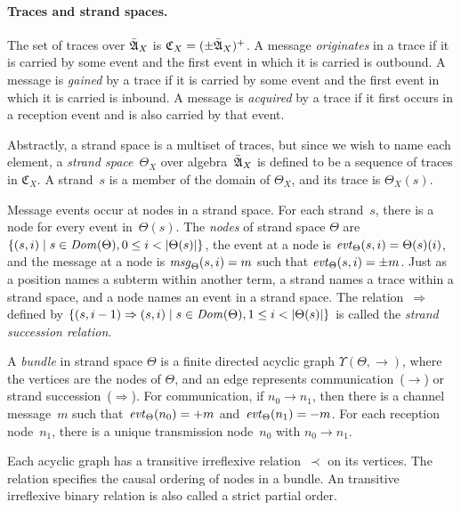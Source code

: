\documentclass[12pt]{report}
\theoremstyle{definition}
\newcommand{\algbara}{\bar{\alg{A}}}
\newcommand{\tr}{\ensuremath{\mathfrak C}}
\newcommand{\sdom}{\fn{Dom}}
\newcommand{\evt}{\fn{evt}}
\newcommand{\msg}{\fn{msg}}
\begin{document}
\paragraph{Traces and strand spaces.}  The set of traces over
$\algbara_X$ is $\tr_X=(\pm\algbara_X)^+$.  A message
\emph{originates} in a trace if it is carried by
some event and the first event in which it is carried is outbound.  A
message is \emph{gained} by a trace if it is carried by
some event and the first event in which it is carried is inbound.  A
message is \emph{acquired} by a trace if it first
occurs in a reception event and is also carried by that event.

Abstractly, a strand space is a multiset of traces, but since we wish
to name each element, a \emph{strand
  space}~$\Theta_X$ over algebra~$\algbara_X$ is defined to be a sequence
of traces in $\tr_X$.  A strand~$s$ is a member of the domain of
$\Theta_X$, and its trace is $\Theta_X(s)$.

Message events occur at nodes in a strand space.  For each strand~$s$,
there is a node for every event in~$\Theta(s)$.  The
\emph{nodes} of strand space $\Theta$ are $\{(s,i)\mid
s\in\sdom(\Theta), 0\leq i< |\Theta(s)|\}$, the event at a node is
\index{evt@\evt}$\evt_\Theta(s,i)=\Theta(s)(i)$, and the message at a
node is \index{msg@\msg}$\msg_\Theta(s,i) = m$ such that
$\evt_\Theta(s,i) = \pm m$.  Just as a position names a subterm within
another term, a strand names a trace within a strand space, and a node
names an event in a strand space.  The relation~$\Rightarrow$ defined
by $\{(s,i-1)\Rightarrow(s,i)\mid s\in\sdom(\Theta), 1\leq
i<|\Theta(s)|\}$ is called the \emph{strand
  succession relation}.

A \emph{bundle} in strand space $\Theta$ is a finite
directed acyclic graph $\Upsilon(\Theta,\to)$, where the vertices are
the nodes of $\Theta$, and an edge represents
communication~($\rightarrow$) or strand succession~($\Rightarrow$).
For communication, if $n_0\rightarrow n_1$, then
there is a channel message~$m$ such that~$\evt_\Theta(n_0)=\outbnd m$
and~$\evt_\Theta(n_1)=\inbnd m$.  For each reception node~$n_1$, there
is a unique transmission node~$n_0$ with $n_0\rightarrow n_1$.

Each acyclic graph has a transitive irreflexive relation~$\prec$ on
its vertices.  The relation specifies the causal ordering of nodes in
a bundle.  An transitive irreflexive binary relation is also called a
strict partial
order.
\end{document}
